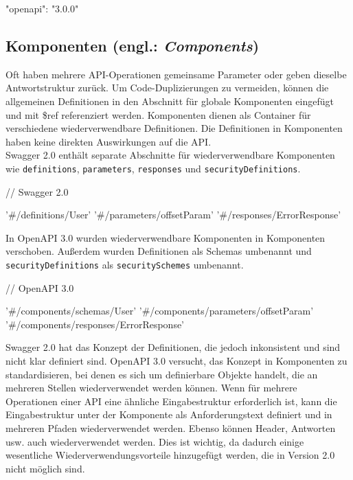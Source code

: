 \begin{LaTeXCode}[caption={Version von Open API},captionpos=b, label=LaTeXCode:openapi3.0-1][numbers=none]
"openapi": "3.0.0"\\
\end{LaTeXCode}

\subsection{Komponenten (engl.: \textit{Components})}

Oft haben mehrere API-Operationen gemeinsame Parameter oder geben dieselbe Antwortstruktur zurück. Um Code-Duplizierungen zu vermeiden, können die allgemeinen Definitionen in den Abschnitt für globale Komponenten eingefügt und mit \$ref referenziert werden. Komponenten dienen als Container für verschiedene wiederverwendbare Definitionen. Die Definitionen in Komponenten haben keine direkten Auswirkungen auf die API\cite{openapicomponents17}.\\

Swagger 2.0 enthält separate Abschnitte für wiederverwendbare Komponenten wie \texttt{definitions}, \texttt{parameters}, \texttt{responses} und \texttt{securityDefinitions}\cite{swagger20Github}.\\

\begin{LaTeXCode}[caption={Open API 2.0 - Komponenten\cite{openapicomponents17}},captionpos=b, label=LaTeXCode:openapi3.0-2][numbers=none]
// Swagger 2.0    

'#/definitions/User'
'#/parameters/offsetParam'
'#/responses/ErrorResponse'
\end{LaTeXCode}

In OpenAPI 3.0 wurden wiederverwendbare Komponenten in Komponenten verschoben. Außerdem wurden Definitionen als Schemas umbenannt und \texttt{securityDefinitions} als \texttt{securitySchemes} umbenannt\cite{openapi20Github}.\\

\begin{LaTeXCode}[caption={Open API 3.0 - Komponenten\cite{openapicomponents17}},captionpos=b, label=LaTeXCode:openapi3.0-3][numbers=none]
// OpenAPI 3.0

'#/components/schemas/User'
'#/components/parameters/offsetParam'
'#/components/responses/ErrorResponse'
\end{LaTeXCode}

Swagger 2.0 hat das Konzept der Definitionen, die jedoch inkonsistent und sind nicht klar definiert sind. OpenAPI 3.0 versucht, das Konzept in Komponenten zu standardisieren, bei denen es sich um definierbare Objekte handelt, die an mehreren Stellen wiederverwendet werden können. Wenn für mehrere Operationen einer API eine ähnliche Eingabestruktur erforderlich ist, kann die Eingabestruktur unter der Komponente als Anforderungstext definiert und in mehreren Pfaden wiederverwendet werden. Ebenso können Header, Antworten usw. auch wiederverwendet werden. Dies ist wichtig, da dadurch einige wesentliche Wiederverwendungsvorteile hinzugefügt werden, die in Version 2.0 nicht möglich sind\cite{swagger20Github, openapi20Github}.\\

